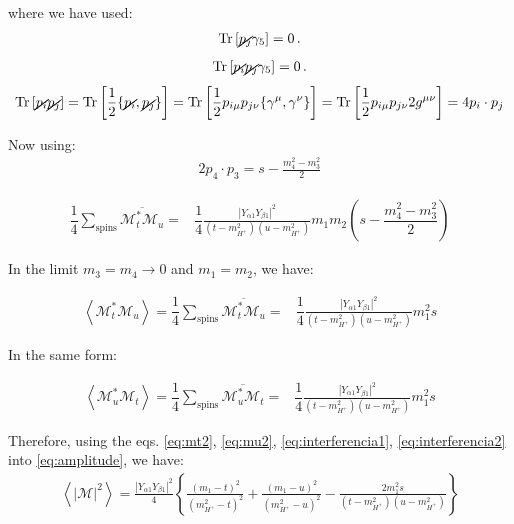 \documentclass[12pt,letterpaper]{article}
\begin{document}
where we have used:
\begin{align*}
  \operatorname{Tr}\left[ \cancel{p_j}\gamma_5 \right]=0\,.
\end{align*}
\begin{align*}
  \operatorname{Tr}\left[ \cancel{p_i}\cancel{p_j}\gamma_5 \right]=0\,.
\end{align*}
\begin{align*}
  \operatorname{Tr}\left[ \cancel{p_i}\cancel{p_j}\right]
  =\operatorname{Tr}\left[ \dfrac{1}{2} \{\cancel{p_i},\cancel{p_j}\}\right]
  =\operatorname{Tr}\left[ \dfrac{1}{2} p_{i\mu}p_{j\nu}\{\gamma^{\mu},\gamma^{\nu}\}\right]
    =\operatorname{Tr}\left[ \dfrac{1}{2} p_{i\mu}p_{j\nu}2g^{\mu\nu}\right]=4p_i\cdot p_j
\end{align*}

Now using:
\begin{align}
  2 p_4\cdot p_{3}=s-\frac{m_4^2-m_3^2}{2}
\end{align}

\begin{align*}
\dfrac{1}{4}\sum_{\text{spins}}  \overline{\mathcal{M}_t^{*} \mathcal{M}_{u}}
=&\dfrac{1}{4}\frac{|Y_{\alpha 1} Y_{\beta 1}|^2}{(t-m_{H^+}^2)(u-m_{H^+}^2)}
m_1m_2 \left(s-\dfrac{m_4^2-m_3^2}{2}\right)
\end{align*}

In the limit $m_3=m_4 \rightarrow 0$ and $m_1=m_2$, we have:

\begin{align}
\label{eq:interferencia1}
\left \langle\mathcal{M}_t^{*} \mathcal{M}_{u} \right\rangle=\dfrac{1}{4}\sum_{\text{spins}}  \overline{\mathcal{M}_t^{*} \mathcal{M}_{u}}
=&\dfrac{1}{4}\frac{|Y_{\alpha 1} Y_{\beta 1}|^2}{(t-m_{H^+}^2)(u-m_{H^+}^2)}
m_1^2 s
\end{align}

In the same form:

\begin{align}
\label{eq:interferencia2}
\left \langle\mathcal{M}_u^{*} \mathcal{M}_{t} \right\rangle=\dfrac{1}{4}\sum_{\text{spins}}  \overline{\mathcal{M}_u^{*} \mathcal{M}_{t}}
=&\dfrac{1}{4}\frac{|Y_{\alpha 1} Y_{\beta 1}|^2}{(t-m_{H^+}^2)(u-m_{H^+}^2)}
m_1^2 s
\end{align}

Therefore, using the eqs. \eqref{eq:mt2}, \eqref{eq:mu2}, \eqref{eq:interferencia1}, \eqref{eq:interferencia2} into \eqref{eq:amplitude}, we have:
\begin{align}
\label{eq:tw}
\boxed{
  \left\langle \left| \mathcal{M} \right|^2 \right\rangle=
\frac{|Y_{\alpha 1}Y_{\beta 1}|^2}{4} \left\{ 
\frac{\left(m_1-t  \right)^2}{\left( m_{H^+}^2-t \right)^2}+
\frac{\left(m_1-u  \right)^2}{\left( m_{H^+}^2-u \right)^2}-
\frac{2 m_1^2 s}{\left( t-m_{H^+}^2 \right)\left( u-m_{H^+}^2 \right)}
 \right\}
 }
\end{align}
\end{document}
